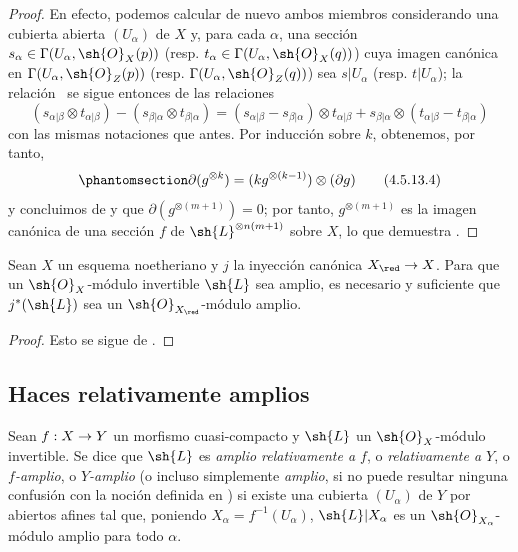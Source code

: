\documentclass[oneside,10pt]{amsart}
\makeatletter
\newcommand{\ega@arrow}[2]{\mathchoice{#1}{#2}{#2}{#2}}
\renewcommand{\to}{\ega@arrow{\longrightarrow}{\rightarrow}}
\newcommand{\oldpage}[2][]{\marginnote{\normalfont\footnotesize\textbf{#1}~|~#2}\ignorespaces}
\let\EGAOriginalLabel\label
\renewcommand{\label}[1]{\phantomsection\EGAOriginalLabel{#1}}
\makeatother
\begin{document}
\begin{proof}
  En efecto, podemos calcular de nuevo ambos miembros considerando una cubierta abierta $(U_\alpha)$ de $X$ y, para cada $\alpha$, una sección $s_\alpha\in\Gamma(U_\alpha,\sh{O}_X(p))$ (resp. $t_\alpha\in\Gamma(U_\alpha,\sh{O}_X(q))$) cuya imagen canónica en $\Gamma(U_\alpha,\sh{O}_Z(p))$ (resp. $\Gamma(U_\alpha,\sh{O}_Z(q))$) sea $s|U_\alpha$ (resp. $t|U_\alpha$);
  la relación~ se sigue entonces de las relaciones
  \[
    (s_{\alpha|\beta}\otimes t_{\alpha|\beta})-(s_{\beta|\alpha}\otimes t_{\beta|\alpha})
    =(s_{\alpha|\beta}-s_{\beta|\alpha})\otimes t_{\alpha|\beta}+s_{\beta|\alpha}\otimes(t_{\alpha|\beta}-t_{\beta|\alpha})
  \]
  con las mismas notaciones que antes.
  Por inducción sobre $k$, obtenemos, por tanto,
  \[
  \label{II.4.5.13.4}
    \partial(g^{\otimes k})=(kg^{\otimes(k-1)})\otimes(\partial g)
  \tag{4.5.13.4}
  \]
\oldpage[II]{89}
  y concluimos de  y  que $\partial(g^{\otimes(m+1)})=0$;
  por tanto, $g^{\otimes(m+1)}$ es la imagen canónica de una sección $f$ de $\sh{L}^{\otimes n(m+1)}$ sobre $X$, lo que demuestra .
\end{proof}

\begin{corollary}[4.5.14]
\label{II.4.5.14}
Sean $X$ un esquema noetheriano y $j$ la inyección canónica $X_\red\to X$.
Para que un $\sh{O}_X$-módulo invertible $\sh{L}$ sea amplio, es necesario y suficiente que $j^*(\sh{L})$ sea un $\sh{O}_{X_\red}$-módulo amplio.
\end{corollary}

\begin{proof}
Esto se sigue de .
\end{proof}

\subsection{Haces relativamente amplios}
\label{subsection:II.4.6}

\begin{definition}[4.6.1]
\label{II.4.6.1}
Sean $f:X\to Y$ un morfismo cuasi-compacto y $\sh{L}$ un $\sh{O}_X$-módulo invertible.
Se dice que $\sh{L}$ es \emph{amplio relativamente a $f$}, o \emph{relativamente a $Y$}, o \emph{$f$-amplio}, o \emph{$Y$-amplio} \textup{(o incluso simplemente \emph{amplio}, si no puede resultar ninguna confusión con la noción definida en )} si existe una cubierta $(U_\alpha)$ de $Y$ por abiertos afines tal que, poniendo $X_\alpha=f^{-1}(U_\alpha)$, $\sh{L}|X_\alpha$ es un $\sh{O}_{X_\alpha}$-módulo amplio para todo $\alpha$.
\end{definition}
\end{document}
